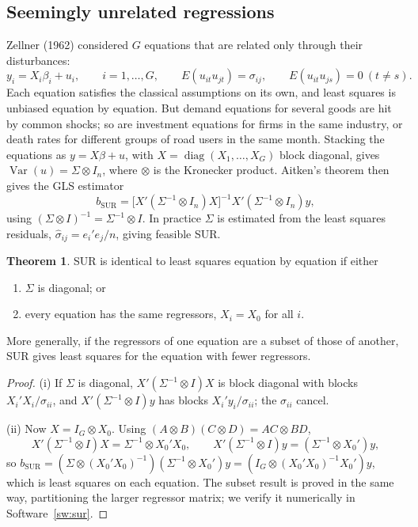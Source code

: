 \documentclass[11pt,a4paper]{article}
\numberwithin{equation}{section}
\DeclareMathOperator{\Var}{Var}
\theoremstyle{definition}
\newtheorem{thm}{Theorem}[subsection]
\begin{document}
\subsection{Seemingly unrelated regressions}
\label{ssec:sur}

Zellner (1962) considered $G$ equations that are related only through their disturbances:
\[
y_i = X_i\beta_i + u_i, \qquad i = 1, \dots, G, \qquad E(u_{it}u_{jt}) = \sigma_{ij}, \qquad E(u_{it}u_{js}) = 0 \ (t \neq s) .
\]
Each equation satisfies the classical assumptions on its own, and least squares is unbiased equation by equation. But demand equations for several goods
are hit by common shocks; so are investment equations for firms in the same industry, or death rates for different groups of road users in the same
month. Stacking the equations as $y = X\beta + u$, with $X = \operatorname{diag}(X_1, \dots, X_G)$ block diagonal, gives $\Var(u) = \Sigma \otimes I_n$, where $\otimes$ is the Kronecker
product. Aitken's theorem then gives the GLS estimator
\[
b_{\text{SUR}} = \bigl[X'(\Sigma^{-1} \otimes I_n)X\bigr]^{-1}X'(\Sigma^{-1} \otimes I_n)y ,
\]
using $(\Sigma \otimes I)^{-1} = \Sigma^{-1} \otimes I$. In practice $\Sigma$ is estimated from the least squares residuals, $\hat\sigma_{ij} = e_i'e_j/n$, giving feasible SUR.

\begin{thm}
\label{thm:surols}
SUR is identical to least squares equation by equation if either
\begin{enumerate}[label=(\roman*)]
\item $\Sigma$ is diagonal; or
\item every equation has the same regressors, $X_i = X_0$ for all $i$.
\end{enumerate}
More generally, if the regressors of one equation are a subset of those of another, SUR gives least squares for the equation with fewer regressors.
\end{thm}

\begin{proof}
(i) If $\Sigma$ is diagonal, $X'(\Sigma^{-1} \otimes I)X$ is block diagonal with blocks $X_i'X_i/\sigma_{ii}$, and $X'(\Sigma^{-1} \otimes I)y$ has blocks $X_i'y_i/\sigma_{ii}$; the $\sigma_{ii}$ cancel.

(ii) Now $X = I_G \otimes X_0$. Using $(A \otimes B)(C \otimes D) = AC \otimes BD$,
\[
X'(\Sigma^{-1} \otimes I)X = \Sigma^{-1} \otimes X_0'X_0, \qquad X'(\Sigma^{-1} \otimes I)y = (\Sigma^{-1} \otimes X_0')y,
\]
so $b_{\text{SUR}} = (\Sigma \otimes (X_0'X_0)^{-1})(\Sigma^{-1} \otimes X_0')y = (I_G \otimes (X_0'X_0)^{-1}X_0')y$, which is least squares on each equation. The subset result is proved
in the same way, partitioning the larger regressor matrix; we verify it numerically in Software~\ref{sw:sur}.
\end{proof}
\end{document}
